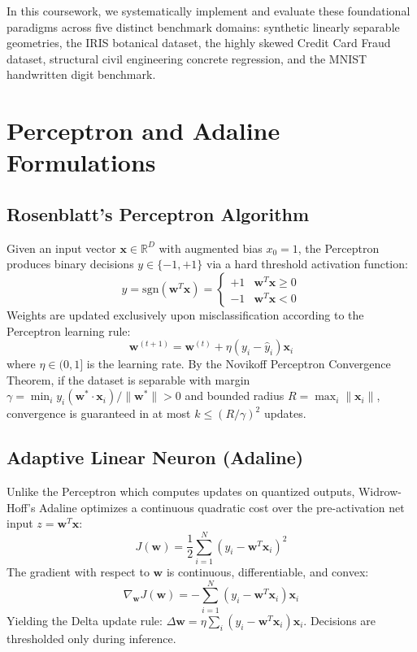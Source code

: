 \documentclass[conference]{IEEEtran}
\begin{document}
In this coursework, we systematically implement and evaluate these foundational paradigms across five distinct benchmark domains: synthetic linearly separable geometries, the IRIS botanical dataset, the highly skewed Credit Card Fraud dataset, structural civil engineering concrete regression, and the MNIST handwritten digit benchmark.

\section{Perceptron and Adaline Formulations}

\subsection{Rosenblatt's Perceptron Algorithm}
Given an input vector $\mathbf{x} \in \mathbb{R}^D$ with augmented bias $x_0 = 1$, the Perceptron produces binary decisions $y \in \{-1, +1\}$ via a hard threshold activation function:
\begin{equation}
y = \text{sgn}(\mathbf{w}^T \mathbf{x}) = \begin{cases} +1 & \mathbf{w}^T \mathbf{x} \ge 0 \\ -1 & \mathbf{w}^T \mathbf{x} < 0 \end{cases}
\end{equation}
Weights are updated exclusively upon misclassification according to the Perceptron learning rule:
\begin{equation}
\mathbf{w}^{(t+1)} = \mathbf{w}^{(t)} + \eta (y_i - \hat{y}_i) \mathbf{x}_i
\end{equation}
where $\eta \in (0, 1]$ is the learning rate. By the Novikoff Perceptron Convergence Theorem, if the dataset is separable with margin $\gamma = \min_i y_i (\mathbf{w}^* \cdot \mathbf{x}_i) / \|\mathbf{w}^*\| > 0$ and bounded radius $R = \max_i \|\mathbf{x}_i\|$, convergence is guaranteed in at most $k \le (R / \gamma)^2$ updates.

\subsection{Adaptive Linear Neuron (Adaline)}
Unlike the Perceptron which computes updates on quantized outputs, Widrow-Hoff's Adaline optimizes a continuous quadratic cost over the pre-activation net input $z = \mathbf{w}^T \mathbf{x}$:
\begin{equation}
J(\mathbf{w}) = \frac{1}{2} \sum_{i=1}^N \left( y_i - \mathbf{w}^T \mathbf{x}_i \right)^2
\end{equation}
The gradient with respect to $\mathbf{w}$ is continuous, differentiable, and convex:
\begin{equation}
\nabla_{\mathbf{w}} J(\mathbf{w}) = -\sum_{i=1}^N (y_i - \mathbf{w}^T \mathbf{x}_i) \mathbf{x}_i
\end{equation}
Yielding the Delta update rule: $\Delta \mathbf{w} = \eta \sum_{i} (y_i - \mathbf{w}^T \mathbf{x}_i) \mathbf{x}_i$. Decisions are thresholded only during inference.
\end{document}
